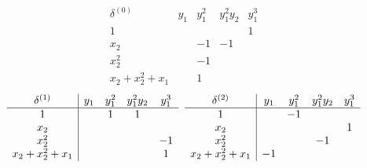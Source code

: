 \documentclass{standalone}
\begin{document}
$$
\begin{array}{c|cccc}
	\delta^{(0)} & y_1 & y_1^2 & y_1^2y_2 & y_1^3 \\
	\hline
	1  &   &  &  & 1 \\
	x_2  &  & -1 & -1 & \\
	x_2^2  &  & -1 &  & \\
	x_2 + x_2^{2} + x_1  &  & 1 &  &
\end{array}$$
$$
\begin{array}{c|cccc}
	\delta^{(1)} & y_1 & y_1^2 & y_1^2y_2 & y_1^3 \\
	\hline
	1  &  & 1 & 1 & \\
	x_2  &  &  &  & \\
	x_2^2  &  &  &  & -1 \\
	x_2 + x_2^{2} + x_1  &  &  &  & 1
\end{array}
\hspace{0.2cm}
\begin{array}{c|cccc}
	\delta^{(2)} & y_1 & y_1^2 & y_1^2y_2 & y_1^3 \\
	\hline
	1  &  & -1 &  & \\
	x_2  &  &  &  & 1 \\
	x_2^2  &  &  & -1 & \\
	x_2 + x_2^{2} + x_1  & -1 &  &  &
\end{array}$$
\end{document}
